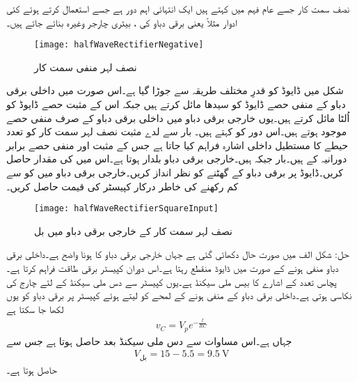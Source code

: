 نصف سمت کار جسے عام فہم میں  کہتے ہیں ایک انتہائی اہم دور ہے جسے استعمال کرتے ہوئے کئی ادوار مثلاً  یعنی برقی دباو کی  ، بیٹری چارجر وغیرہ بنائے جاتے ہیں۔
\begin{figure}
\centering
\texttt{[image: halfWaveRectifierNegative]}
\caption{نصف لہر منفی سمت کار}
\label{شکل_نصف_لہر_منفی_سمت_کار}
\end{figure}
شکل  میں ڈایوڈ کو قدرِ مختلف طریقہ سے جوڑا گیا ہے۔اس صورت میں داخلی برقی دباو  کے منفی حصے ڈایوڈ کو سیدھا مائل کرتے ہیں جبکہ اس کے مثبت حصے ڈایوڈ کو اُلٹا مائل کرتے ہیں۔یوں خارجی برقی دباو میں داخلی برقی دباو کے صرف منفی حصے موجود ہوتے ہیں۔اس دور کو  کہتے ہیں۔
بار سے لدے مثبت نصف لہر سمت کار کو  تعدد  حیطے کا مستطیل داخلی اشارہ فراہم کیا جاتا ہے جس کے مثبت اور منفی حصے برابر دورانیہ کے ہیں۔بار  جبکہ  ہیں۔خارجی برقی دباو بلدار ہوتا ہے۔اس میں  کی مقدار حاصل کریں۔ڈایوڈ پر برقی دباو کے گھٹنے کو نظر انداز کریں۔خارجی برقی دباو میں  کو  سے کم رکھنے کی خاطر درکار کپیسٹر کی قیمت حاصل کریں۔
\begin{figure}
\centering
\texttt{[image: halfWaveRectifierSquareInput]}
\caption{نصف لہر سمت کار کے خارجی برقی دباو میں بل}
\label{شکل_نصف_لہر_سمتکار_بل}
\end{figure}
حل:
شکل  الف میں صورت حال دکھائی گئی ہے جہاں خارجی برقی دباو کا  ہونا واضح ہے۔داخلی برقی دباو منفی ہونے کے صورت میں ڈایوڈ منقطع رہتا ہے۔اس دوران کپیسٹر  برقی طاقت فراہم کرتا ہے۔پچاس تعدد کے اشارے کا  بیس ملی سیکنڈ ہے۔یوں کپیسٹر سے دس ملی سیکنڈ کے لئے چارج کی نکاسی ہوتی ہے۔داخلی برقی دباو کے منفی ہونے کے لمحے کو  لیتے ہوئے کپیسٹر پر برقی دباو  کو یوں لکھا جا سکتا ہے
\begin{align*}
v_C=V_p e^{-\frac{t}{RC}}
\end{align*}
جہاں  ہے۔اس مساوات سے دس ملی سیکنڈ بعد  حاصل ہوتا ہے جس سے
\begin{align*}
V_{\textrm{بل}}=15-5.5=\SI{9.5}{\volt}
\end{align*}
حاصل ہوتا ہے۔

